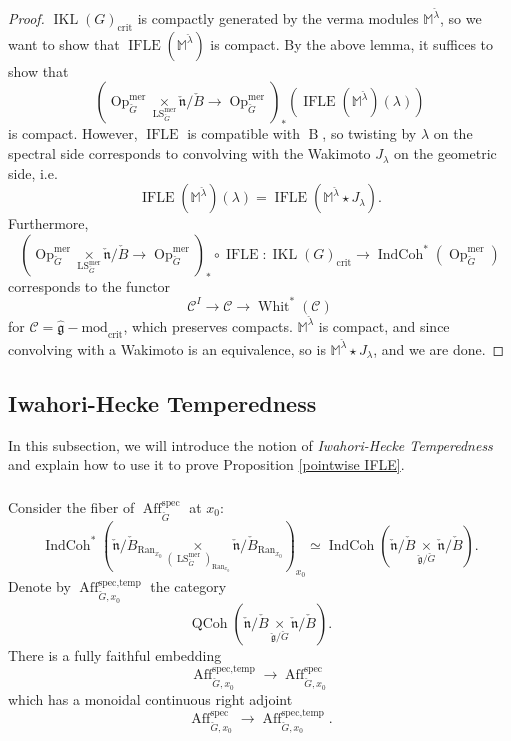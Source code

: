 \documentclass[10pt]{amsart}
\theoremstyle{remark}
\newcommand{\on}[1]{\operatorname{#1}}
\newcommand{\QCoh}{\on{QCoh}}
\newcommand{\IndCoh}{\on{IndCoh}}
\newcommand{\gmod}{\on{\hat{\mathfrak{g}}-mod}}
\newcommand{\IKL}{\on{IKL}(G)_{\on{crit}}}
\newcommand{\Gcheck}{\check{G}}
\newcommand{\gcheck}{\check{\mathfrak{g}}}
\newcommand{\ncheck}{\check{\mathfrak{n}}}
\newcommand{\Bcheck}{\check{B}}
\newcommand{\Ran}{\on{Ran}}
\newcommand{\sssec}[1]{\subsubsection{}}
\begin{document}
\begin{proof}
    $\IKL$ is compactly generated by the verma modules $\mathbb{M}^{\check{\lambda}}$, so we want to show that $\on{IFLE}(\mathbb{M}^{\check{\lambda}})$ is compact. By the above lemma, it suffices to show that
    $$
    (\on{Op}_{\Gcheck}^{\on{mer}} \underset{\on{LS}_{\Gcheck}^{\on{mer}}}{\times} \ncheck/\Bcheck \to \on{Op}_{\Gcheck}^{\on{mer}})_*(\on{IFLE}(\mathbb{M}^{\check{\lambda}})(\lambda))
    $$
    is compact. However, $\on{IFLE}$ is compatible with $\on{B}$, so twisting by $\lambda$ on the spectral side corresponds to convolving with the Wakimoto $J_{\lambda}$ on the geometric side, i.e.
    $$
    \on{IFLE}(\mathbb{M}^{\check{\lambda}})(\lambda) = \on{IFLE}(\mathbb{M}^{\check{\lambda}} \star J_{\lambda}).
    $$
    Furthermore, 
    $$
    (\on{Op}_{\Gcheck}^{\on{mer}} \underset{\on{LS}_{\Gcheck}^{\on{mer}}}{\times} \ncheck/\Bcheck \to \on{Op}_{\Gcheck}^{\on{mer}})_* \circ \on{IFLE} : \IKL \longrightarrow \IndCoh^*(\on{Op}_{\Gcheck}^{\on{mer}})
    $$
    corresponds to the functor
    $$
    \mathcal{C}^I \longrightarrow \mathcal{C} \longrightarrow \on{Whit}^*(\mathcal{C})
    $$
    for $\mathcal{C} = \gmod_{\on{crit}}$, which preserves compacts. $\mathbb{M}^{\check{\lambda}}$ is compact, and since convolving with a Wakimoto is an equivalence, so is $\mathbb{M}^{\check{\lambda}} \star J_{\lambda}$, and we are done.
\end{proof}

\subsection{Iwahori-Hecke Temperedness} \label{Affine Temperedness}
In this subsection, we will introduce the notion of \emph{Iwahori-Hecke Temperedness} and explain how to use it to prove Proposition \ref{pointwise IFLE}.

\sssec{}
Consider the fiber of $\on{Aff}_{\Gcheck}^{\on{spec}}$ at $x_0$:
$$
\IndCoh^*(\ncheck/\Bcheck_{\Ran_{x_0}} \underset{(\on{LS}_{\Gcheck}^{\on{mer}})_{\Ran_{x_0}}}{\times} \ncheck/\Bcheck_{\Ran_{x_0}})_{x_0} \simeq \IndCoh(\ncheck/\Bcheck \underset{\gcheck/\Gcheck}{\times} \ncheck/\Bcheck).
$$
Denote by $\on{Aff}_{\Gcheck, x_0}^{\on{spec, temp}}$ the category
$$
\QCoh(\ncheck/\Bcheck \underset{\gcheck/\Gcheck}{\times} \ncheck/\Bcheck).
$$
There is a fully faithful embedding
$$
\on{Aff}_{\Gcheck, x_0}^{\on{spec, temp}} \to \on{Aff}_{\Gcheck, x_0}^{\on{spec}}
$$
which has a monoidal continuous right adjoint
$$
\on{Aff}_{\Gcheck, x_0}^{\on{spec}} \to \on{Aff}_{\Gcheck, x_0}^{\on{spec, temp}}.
$$
\end{document}
